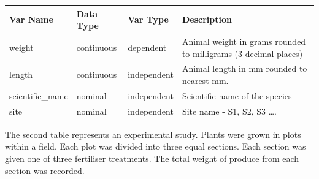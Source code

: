 \documentclass[
]{book}
\begin{document}
\begin{longtable}[]{@{}
  >{\raggedright\arraybackslash}p{}
  >{\raggedright\arraybackslash}p{}
  >{\raggedright\arraybackslash}p{}
  >{\raggedright\arraybackslash}p{}@{}}
\toprule\noalign{}
\begin{minipage}[b]{\linewidth}\raggedright
Var Name
\end{minipage} & \begin{minipage}[b]{\linewidth}\raggedright
Data Type
\end{minipage} & \begin{minipage}[b]{\linewidth}\raggedright
Var Type
\end{minipage} & \begin{minipage}[b]{\linewidth}\raggedright
Description
\end{minipage} \\
\midrule\noalign{}
\endhead
\bottomrule\noalign{}
\endlastfoot
weight & continuous & dependent & Animal weight in grams rounded to milligrams (3 decimal places) \\
length & continuous & independent & Animal length in mm rounded to nearest mm. \\
scientific\_name & nominal & independent & Scientific name of the species \\
site & nominal & independent & Site name - S1, S2, S3 \ldots. \\
\end{longtable}

The second table represents an experimental study. Plants were grown in plots within a field. Each plot was divided into three equal sections. Each section was given one of three fertiliser treatments. The total weight of produce from each section was recorded.
\end{document}
